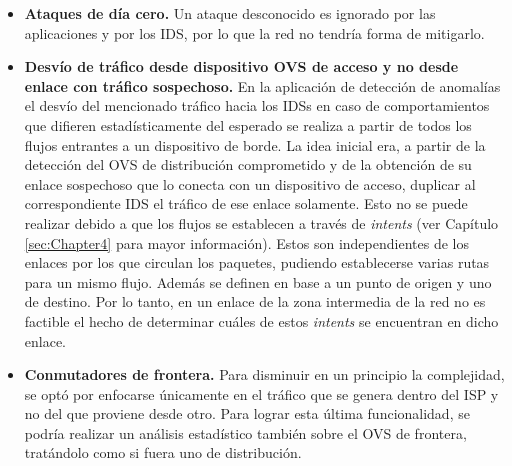 \begin{itemize}
\item{\textbf{Ataques de día cero.} Un ataque desconocido es ignorado por las aplicaciones y por los IDS, por lo que la red no tendría forma de mitigarlo.}

\item{\textbf{Desvío de tráfico desde dispositivo OVS de acceso y no desde enlace con tráfico sospechoso.} En la aplicación de detección de anomalías el desvío del mencionado tráfico hacia los IDSs en caso de comportamientos que difieren estadísticamente del esperado se realiza a partir de todos los flujos entrantes a un dispositivo de borde. La idea inicial era, a partir de la detección del OVS de distribución comprometido y de la obtención de su enlace sospechoso que lo conecta con un dispositivo de acceso, duplicar al correspondiente IDS el tráfico de ese enlace solamente. Esto no se puede realizar debido a que los flujos se establecen a través de \textit{intents} (ver Capítulo \ref{sec:Chapter4} para mayor información). Estos son independientes de los enlaces por los que circulan los paquetes, pudiendo establecerse varias rutas para un mismo flujo. Además se definen en base a un punto de origen y uno de destino. Por lo tanto, en un enlace de la zona intermedia de la red no es factible el hecho de determinar cuáles de estos \textit{intents} se encuentran en dicho enlace.}

\item{\textbf{Conmutadores de frontera.} Para disminuir en un principio la complejidad, se optó por enfocarse únicamente en el tráfico que se genera dentro del ISP y no del que proviene desde otro. Para lograr esta última funcionalidad, se podría realizar un análisis estadístico también sobre el OVS de frontera, tratándolo como si fuera uno de distribución.}

\end{itemize}